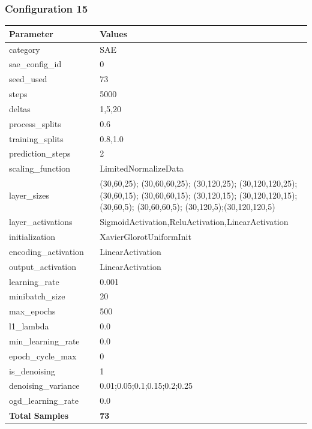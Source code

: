 \documentclass[a4paper,11pt,oneside]{article}
\theoremstyle{plain}
\theoremstyle{definition}
\begin{document}
	\newpage
	\subsubsection{Configuration 15}\label{config15}
	
	\begin{longtable}[H]{|p{0.3\linewidth}|p{0.7\linewidth}|} \hline 			\rowcolor{beaublue}\textbf{Parameter} &\textbf{Values} \\\hline{category} & {SAE} \\\hline
		{sae\_config\_id} & {0} \\\hline
		{seed\_used} & {73} \\\hline
		{steps} & {5000} \\\hline
		{deltas} & {1,5,20} \\\hline
		{process\_splits} & {0.6} \\\hline
		{training\_splits} & {0.8,1.0} \\\hline
		{prediction\_steps} & {2} \\\hline
		{scaling\_function} & {LimitedNormalizeData} \\\hline
		{layer\_sizes} & {(30,60,25); (30,60,60,25); (30,120,25); (30,120,120,25); (30,60,15); (30,60,60,15); (30,120,15); (30,120,120,15); (30,60,5); (30,60,60,5); (30,120,5);(30,120,120,5)} \\\hline
		{layer\_activations} & {SigmoidActivation,ReluActivation,LinearActivation} \\\hline
		{initialization} & {XavierGlorotUniformInit} \\\hline
		{encoding\_activation} & {LinearActivation} \\\hline
		{output\_activation} & {LinearActivation} \\\hline
		{learning\_rate} & {0.001} \\\hline
		{minibatch\_size} & {20} \\\hline
		{max\_epochs} & {500} \\\hline
		{l1\_lambda} & {0.0} \\\hline
		{min\_learning\_rate} & {0.0} \\\hline
		{epoch\_cycle\_max} & {0} \\\hline
		{is\_denoising} & {1} \\\hline
		{denoising\_variance} & {0.01;0.05;0.1;0.15;0.2;0.25} \\\hline
		{ogd\_learning\_rate} & {0.0} \\\hline
		{\textbf{Total Samples}} & {\textbf{73}} \\\hline
	\end{longtable}
	
\end{document}
